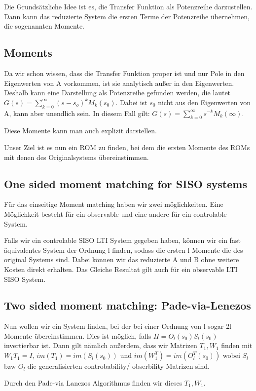 \documentclass[]{article}
\begin{document}
Die Grundsätzliche Idee ist es, die Transfer Funktion als Potenzreihe darzustellen. Dann kann das reduzierte System die ersten Terme der Potenzreihe übernehmen, die sogenannten Momente. 

\subsection{Moments}
Da wir schon wissen, dass die Transfer Funktion proper ist und nur Pole in den Eigenwerten von A vorkommen, ist sie analytisch außer in den Eigenwerten. Deshalb kann eine Darstellung als Potenzreihe gefunden werden, die lautet $G(s)=\sum\limits_{k=0}^{\infty}(s-s_o)^k M_k(s_0)$. Dabei ist $s_0$ nicht aus den Eigenwerten von A, kann aber unendlich sein. In diesem Fall gilt: $G(s)=\sum\limits_{k=0}^{\infty}s^{-k} M_k(\infty)$.

Diese Momente kann man auch explizit darstellen.

Unser Ziel ist es nun ein ROM zu finden, bei dem die ersten Momente des ROMs mit denen des Originalsystems übereinstimmen. 

\subsection{One sided moment matching for SISO systems}
Für das einseitige Moment matching haben wir zwei möglichkeiten. Eine Möglichkeit besteht für ein observable und eine andere für ein controlable System. 

Falls wir ein controlable SISO LTI System gegeben haben, können wir ein fast äquivalentes System der Ordnung l finden, sodass die ersten l Momente die des original Systems sind. Dabei können wir das reduzierte A und B ohne weitere Kosten direkt erhalten. Das Gleiche Resultat gilt auch für ein observable LTI SISO System. 

\subsection{Two sided moment matching: Pade-via-Lenezos}
Nun wollen wir ein System finden, bei der bei einer Ordnung von l sogar 2l Momente übereinstimmen. Dies ist möglich, falls $H=O_l(s_0) S_l(s_0)$ invertierbar ist. Dann gilt nämlich außerdem, dass wir Matrizen $T_1, W_1$ finden mit $W_1T_1=I$, $im(T_1)=im(S_l(s_0))$ und $im(W_1^T)=im(O_l^T(s_0))$ wobei $S_l$ bzw $O_l$ die generalisierten controbability/ obserbility Matrizen sind.

Durch den Pade-via Lanczos Algorithmus finden wir dieses $T_1, W_1$. \\
\end{document}
